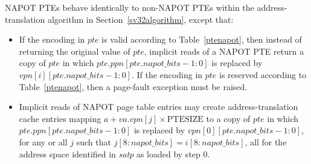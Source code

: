 NAPOT PTEs behave identically to non-NAPOT PTEs within the address-translation
algorithm in Section~\ref{sv32algorithm}, except that:
\begin{itemize}
  \item If the encoding in $pte$ is valid according to Table~\ref{ptenapot},
    then instead of returning the original value of $pte$, implicit reads of a
    NAPOT PTE return a copy of $pte$ in which $pte.ppn[pte.napot\_bits-1:0]$ is
    replaced by $vpn[i][pte.napot\_bits-1:0]$.  If the encoding in $pte$ is
    reserved according to Table~\ref{ptenapot}, then a page-fault exception
    must be raised.
  \item Implicit reads of NAPOT page table entries may create address-translation cache
    entries mapping $a + va.vpn[j] \times \textrm{PTESIZE}$ to a copy of $pte$
    in which $pte.ppn[pte.napot\_bits-1:0]$ is replaced by
    $vpn[0][pte.napot\_bits-1:0]$, for any or all $j$ such that
    ${j[8:napot\_bits]}={i[8:napot\_bits]}$, all for the address space identified
    in {\em satp} as loaded by step 0.
\end{itemize}

